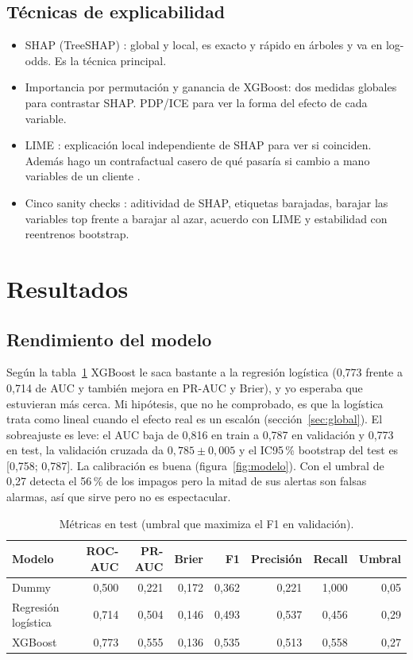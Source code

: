\documentclass[10pt,a4paper]{article}
\newcommand{\var}[1]{\texttt{\detokenize{#1}}}
\begin{document}
\subsection{Técnicas de explicabilidad}
\begin{itemize}\setlength\itemsep{1pt}
  \item SHAP (TreeSHAP) \citep{lundberg2017,lundberg2020}: global y local, es exacto y rápido en árboles y va en log-odds. Es la técnica principal.
  \item Importancia por permutación y ganancia de XGBoost: dos medidas globales para contrastar SHAP. PDP/ICE para ver la forma del efecto de cada variable.
  \item LIME \citep{ribeiro2016}: explicación local independiente de SHAP para ver si coinciden. Además hago un contrafactual casero de qué pasaría si cambio a mano variables de un cliente \citep{wachter2018}.
  \item Cinco sanity checks \citep{adebayo2018}: aditividad de SHAP, etiquetas barajadas, barajar las variables top frente a barajar al azar, acuerdo con LIME y estabilidad con reentrenos bootstrap.
\end{itemize}

\section{Resultados}
\subsection{Rendimiento del modelo}
Según la tabla~\ref{tab:modelos} XGBoost le saca bastante a la regresión logística (0,773 frente a 0,714 de AUC y también mejora en PR-AUC y Brier), y yo esperaba que estuvieran más cerca. Mi hipótesis, que no he comprobado, es que la logística trata \var{PAY_*} como lineal cuando el efecto real es un escalón (sección~\ref{sec:global}). El sobreajuste es leve: el AUC baja de 0,816 en train a 0,787 en validación y 0,773 en test, la validación cruzada da $0{,}785\pm0{,}005$ y el IC95\,\% bootstrap del test es [0,758; 0,787]. La calibración es buena (figura~\ref{fig:modelo}). Con el umbral de 0,27 detecta el 56\,\% de los impagos pero la mitad de sus alertas son falsas alarmas, así que sirve pero no es espectacular.

\begin{table}[htbp]
\centering\small
\caption{Métricas en test (umbral que maximiza el F1 en validación).}\label{tab:modelos}
\begin{tabular}{lrrrrrrr}
\toprule
Modelo & ROC-AUC & PR-AUC & Brier & F1 & Precisión & Recall & Umbral \\
\midrule
Dummy & 0,500 & 0,221 & 0,172 & 0,362 & 0,221 & 1,000 & 0,05 \\
Regresión logística & 0,714 & 0,504 & 0,146 & 0,493 & 0,537 & 0,456 & 0,29 \\
XGBoost & 0,773 & 0,555 & 0,136 & 0,535 & 0,513 & 0,558 & 0,27 \\
\bottomrule
\end{tabular}
\end{table}
\end{document}
